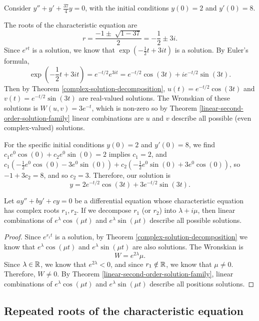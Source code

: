 \begin{exmp}
    Consider $y'' + y' + \frac{37}{4}y = 0$, with the initial conditions $y(0) = 2$ and $y'(0) = 8$.

    The roots of the characteristic equation are \[r = \frac{-1 \pm \sqrt[]{1 - 37}}{2} = -\frac{1}{2} \pm 3i.\] Since $e^{rt}$ is a solution, we know that $\exp\left(-\frac{1}{2}t + 3it\right)$ is a solution. By Euler's formula, \[\exp\left(-\frac{1}{2}t + 3it\right) = e^{-t/2}e^{3it} = e^{-t/2}\cos(3t) + ie^{-t/2}\sin(3t).\] Then by Theorem \ref{complex-solution-decomposition}, $u(t) = e^{-t/2}\cos(3t)$ and $v(t) = e^{-t/2}\sin(3t)$ are real-valued solutions. The Wronskian of these solutions is $W(u, v) = 3e^{-t}$, which is non-zero so by Theorem \ref{linear-second-order-solution-family} linear combinations are $u$ and $v$ describe all possible (even complex-valued) solutions.

    For the specific initial conditions $y(0) = 2$ and $y'(0) = 8$, we find $c_1e^{0}\cos(0) + c_2e^{0}\sin(0) = 2$ implies $c_1 = 2$, and $c_1(-\frac{1}{2}e^{0}\cos(0) - 3e^{0}\sin(0)) + c_2(-\frac{1}{2}e^{0}\sin(0) + 3e^{0}\cos(0))$, so $-1 + 3c_2 = 8$, and so $c_2 = 3$. Therefore, our solution is \[y = 2e^{-t/2}\cos(3t) + 3e^{-t/2}\sin(3t).\]
\end{exmp}

\begin{prop}
    Let $ay'' + by' + cy = 0$ be a differential equation whose characteristic equation has complex roots $r_1, r_2$. If we decompose $r_1$ (or $r_2$) into $\lambda + i\mu$, then linear combinations of $e^{\lambda}\cos(\mu{t})$ and $e^{\lambda}\sin(\mu{t})$ describe all possible solutions.
\end{prop}

\begin{proof}
    Since $e^{r_1t}$ is a solution, by Theorem \ref{complex-solution-decomposition} we know that $e^{\lambda}\cos(\mu{t})$ and $e^{\lambda}\sin(\mu{t})$ are also solutions. The Wronskian is
    \[W = e^{2\lambda}\mu.\] Since $\lambda \in \mathbb{R}$, we know that $e^{2\lambda} < 0$, and since $r_1 \notin \mathbb{R}$, we know that $\mu \neq 0$. Therefore, $W \neq 0$. By Theorem \ref{linear-second-order-solution-family}, linear combinations of $e^{\lambda}\cos(\mu{t})$ and $e^{\lambda}\sin(\mu{t})$ describe all positions solutions.
\end{proof}

\subsection{Repeated roots of the characteristic equation}

